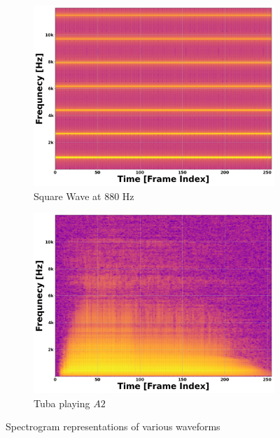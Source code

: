 \documentclass[12pt,letterpaper]{article}
\begin{document}
\begin{figure}[H]
	\begin{subfigure}[b]{0.45\textwidth}
	\centering
	\includegraphics[scale=0.2]{../FiguresSpectrogram/SquareWave-880Hz}
	\caption{Square Wave at $880$ Hz}
	\end{subfigure}
	\hfill
	\begin{subfigure}[b]{0.45\textwidth}
	\centering
	\includegraphics[scale=0.2]{../FiguresSpectrogram/Tuba-A2}
	\caption{Tuba playing $A2$}
	\end{subfigure}

\caption{Spectrogram representations of various waveforms}
\label{fig-Spectrograms}
\end{figure}

\end{document}
